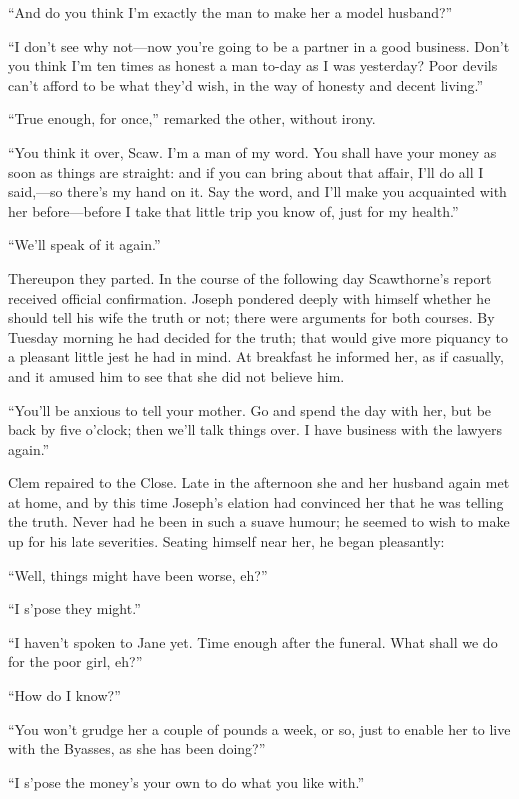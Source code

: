 ``And do you think I'm exactly the man to make her a model husband?''

``I don't see why not---now you're going to be a partner in a good
business. Don't you think I'm ten times as honest a man to-day as I was
yesterday? Poor devils can't afford to be what they'd wish, in the way
of honesty and decent living.''

``True enough, for once,'' remarked the other, without irony.

``You think it over, Scaw. I'm a man of my word. You shall have your
money as soon as things are straight: and if you can bring about that
affair, I'll do all I said,---so there's my hand on it. Say the word,
and I'll make you acquainted with her before---before I take that little
trip you know of, just for my health.''

``We'll speak of it again.''

Thereupon they parted. In the course of the following day Scawthorne's
report received {\protect\hypertarget{179}{}{}}official confirmation.
Joseph pondered deeply with himself whether he should tell his wife the
truth or not; there were arguments for both courses. By Tuesday morning
he had decided for the truth; that would give more piquancy to a
pleasant little jest he had in mind. At breakfast he informed her, as if
casually, and it amused him to see that she did not believe him.

``You'll be anxious to tell your mother. Go and spend the day with her,
but be back by five o'clock; then we'll talk things over. I have
business with the lawyers again.''

Clem repaired to the Close. Late in the afternoon she and her husband
again met at home, and by this time Joseph's elation had convinced her
that he was telling the truth. Never had he been in such a suave humour;
he seemed to wish to make up for his late severities. Seating himself
near her, he began pleasantly:

``Well, things might have been worse, eh?''

``I s'pose they might.''

``I haven't spoken to Jane yet. Time enough after the funeral. What
shall we do for the poor girl, eh?''

{\protect\hypertarget{180}{}{}}``How do I know?''

``You won't grudge her a couple of pounds a week, or so, just to enable
her to live with the Byasses, as she has been doing?''

``I s'pose the money's your own to do what you like with.''

